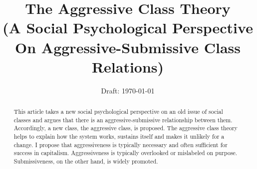 \documentclass[11pt, letterpaper]{article}
\date{Draft: {}\today}
\title{The Aggressive Class Theory\\ {\large (A Social Psychological %
    Perspective On  Aggressive-Submissive Class Relations)}%
% 
}
\author{
 }
\begin{document}


\maketitle
\vspace{-.4in}
\begin{center}

\end{center}

\begin{abstract}
\noindent %

\noindent This article takes a new social psychological perspective on an old
issue of social classes and argues that there is an aggressive-submissive
relationship between them. Accordingly, a new class, the aggressive class, is
proposed. The aggressive class theory  helps to explain how the system works,
sustains itself and makes it unlikely for a change.
%
I propose that aggressiveness is typically necessary and often sufficient for success
in capitalism. Aggressiveness is typically overlooked or mislabeled on purpose. 
 Submissiveness, on the other hand, is widely promoted. %

\end{abstract}

\vspace{.15in} 
\end{document}
